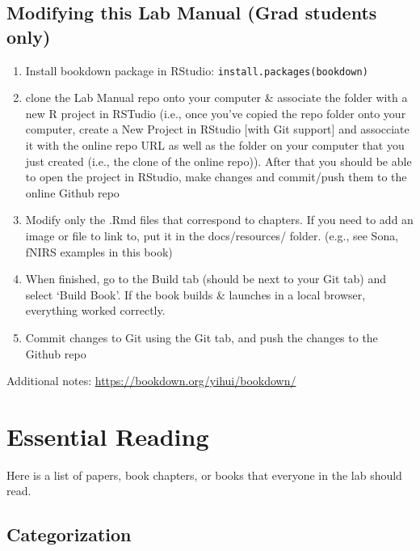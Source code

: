\documentclass[
]{book}
\begin{document}
\hypertarget{modifying-this-lab-manual-grad-students-only}{%
\section{Modifying this Lab Manual (Grad students only)}\label{modifying-this-lab-manual-grad-students-only}}

\begin{enumerate}
\def\labelenumi{\arabic{enumi}.}
\item
  Install bookdown package in RStudio: \texttt{install.packages(\textquotesingle{}bookdown\textquotesingle{})}
\item
  clone the Lab Manual repo onto your computer \& associate the folder with a new R project in RSTudio (i.e., once you've copied the repo folder onto your computer, create a New Project in RStudio {[}with Git support{]} and assocciate it with the online repo URL as well as the folder on your computer that you just created (i.e., the clone of the online repo)). After that you should be able to open the project in RStudio, make changes and commit/push them to the online Github repo
\item
  Modify only the .Rmd files that correspond to chapters. If you need to add an image or file to link to, put it in the docs/resources/ folder. (e.g., see Sona, fNIRS examples in this book)
\item
  When finished, go to the Build tab (should be next to your Git tab) and select `Build Book'. If the book builds \& launches in a local browser, everything worked correctly.
\item
  Commit changes to Git using the Git tab, and push the changes to the Github repo
\end{enumerate}

Additional notes: \url{https://bookdown.org/yihui/bookdown/}

\hypertarget{essential-reading}{%
\chapter{Essential Reading}\label{essential-reading}}

Here is a list of papers, book chapters, or books that everyone in the lab should read.

\hypertarget{categorization}{%
\section{Categorization}\label{categorization}}
\end{document}

